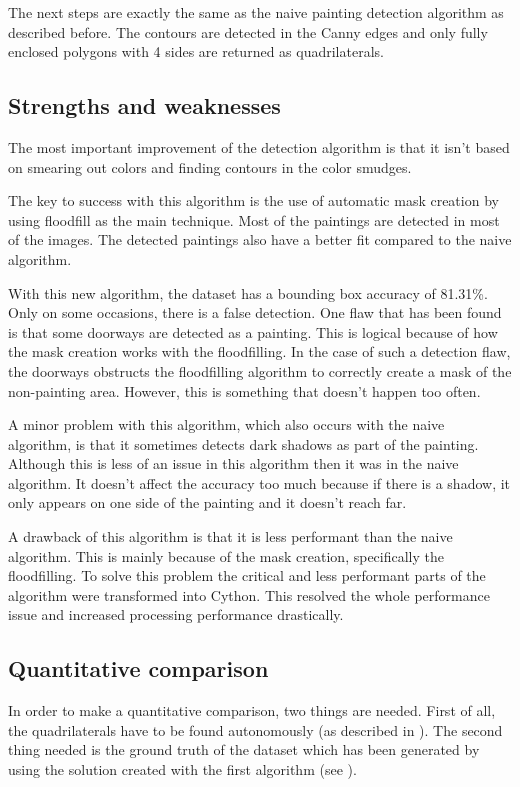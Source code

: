 The next steps are exactly the same as the naive painting detection algorithm as described before. The contours are detected in the Canny edges and only fully enclosed polygons with 4 sides are returned as quadrilaterals.

\subsection{Strengths and weaknesses}

The most important improvement of the detection algorithm is that it isn't based on smearing out colors and finding contours in the color smudges.

The key to success with this algorithm is the use of automatic mask creation by using floodfill as the main technique. Most of the paintings are detected in most of the images. The detected paintings also have a better fit compared to the naive algorithm.

With this new algorithm, the dataset has a bounding box accuracy of 81.31\%. Only on some occasions, there is a false detection. One flaw that has been found is that some doorways are detected as a painting. This is logical because of how the mask creation works with the floodfilling. In the case of such a detection flaw, the doorways obstructs the floodfilling algorithm to correctly create a mask of the non-painting area. However, this is something that doesn't happen too often.

A minor problem with this algorithm, which also occurs with the naive algorithm, is that it sometimes detects dark shadows as part of the painting. Although this is less of an issue in this algorithm then it was in the naive algorithm. It doesn't affect the accuracy too much because if there is a shadow, it only appears on one side of the painting and it doesn't reach far.

A drawback of this algorithm is that it is less performant than the naive algorithm. This is mainly because of the mask creation, specifically the floodfilling. To solve this problem the critical and less performant parts of the algorithm were transformed into Cython. This resolved the whole performance issue and increased processing performance drastically. \cite{behnel2011cython}

\subsection{Quantitative comparison}
In order to make a quantitative comparison, two things are needed. First of all, the quadrilaterals have to be found autonomously (as described in ). The second thing needed is the ground truth of the dataset which has been generated by using the solution created with the first algorithm (see ).

